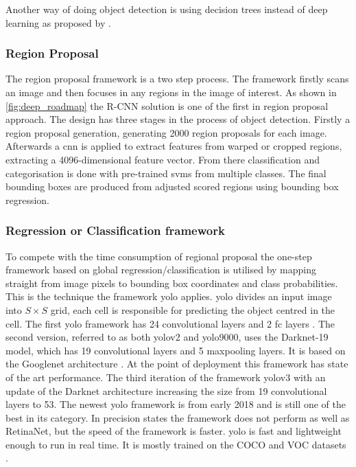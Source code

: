 Another way of doing object detection is using decision trees instead of deep learning as proposed by \cite{Gall2012}.

\subsubsection{Region Proposal}
The region proposal framework is a two step process. The framework firstly scans an image and then focuses in any regions in the image of interest. As shown in \autoref{fig:deep_roadmap} the R-CNN solution is one of the first in region proposal approach. The design has three stages in the process of object detection. Firstly a region proposal generation, generating 2000 region proposals for each image. Afterwards a \gls{cnn} is applied to extract features from warped or cropped regions, extracting a 4096-dimensional feature vector. From there classification and categorisation is done with pre-trained \gls{svm}s from multiple classes. The final bounding boxes are produced from adjusted scored regions using bounding box regression.

\subsubsection{Regression or Classification framework}
To compete with the time consumption of regional proposal the one-step framework based on global regression/classification is utilised by mapping straight from image pixels to bounding box coordinates and class probabilities.
This is the technique the framework \gls{yolo} applies. \gls{yolo} divides an input image into $S \times S$ grid, each cell is responsible for predicting the object centred in the cell.
The first \gls{yolo} framework has 24 convolutional layers and 2 \gls{fc} layers \citep{zhao}. The second version, referred to as both \gls{yolo}v2 and \gls{yolo}9000, uses the Darknet-19 model, which has 19 convolutional layers and 5 maxpooling layers. It is based on the Googlenet architecture \citep{Redmon2016}. At the point of deployment this framework has state of the art performance. The third iteration of the framework \gls{yolo}v3 with an update of the Darknet architecture increasing the size from 19 convolutional layers to 53. The newest \gls{yolo} framework is from early 2018 and is still one of the best in its category. In precision \cite{Redmon2018} states the framework does not perform as well as RetinaNet, but the speed of the framework is faster. \gls{yolo} is fast and lightweight enough to run in real time. It is mostly trained on the COCO and VOC datasets \citep{Redmon2018}.

